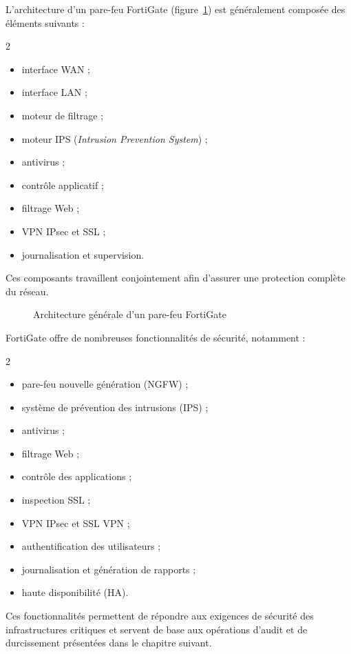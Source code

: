 L'architecture d'un pare-feu FortiGate (figure~\ref{fig:forti-arch}) est généralement composée des éléments suivants :
\begin{multicols}{2}
\begin{itemize}
  \item interface WAN ;
  \item interface LAN ;
  \item moteur de filtrage ;
  \item moteur IPS (\emph{Intrusion Prevention System}) ;
  \item antivirus ;
  \item contrôle applicatif ;
  \item filtrage Web ;
  \item VPN IPsec et SSL ;
  \item journalisation et supervision.
\end{itemize}
\end{multicols}
Ces composants travaillent conjointement afin d'assurer une protection complète du réseau.

\begin{figure}[htbp]
\centering
{}
\caption{Architecture générale d'un pare-feu FortiGate}
\label{fig:forti-arch}
\end{figure}

FortiGate offre de nombreuses fonctionnalités de sécurité, notamment :
\begin{multicols}{2}
\begin{itemize}
  \item pare-feu nouvelle génération (NGFW) ;
  \item système de prévention des intrusions (IPS) ;
  \item antivirus ;
  \item filtrage Web ;
  \item contrôle des applications ;
  \item inspection SSL ;
  \item VPN IPsec et SSL VPN ;
  \item authentification des utilisateurs ;
  \item journalisation et génération de rapports ;
  \item haute disponibilité (HA).
\end{itemize}
\end{multicols}
Ces fonctionnalités permettent de répondre aux exigences de sécurité des infrastructures critiques et servent de base aux opérations d'audit et de durcissement présentées dans le chapitre suivant.

